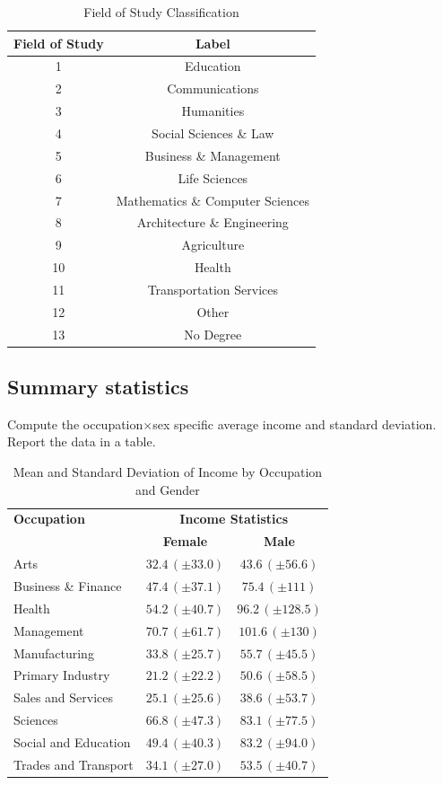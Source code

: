 \documentclass[12pt]{article}
\begin{document}
\begin{table}[h]
\centering
\caption{Field of Study Classification}
\label{tab:field-study-names}
\begin{tabular}{@{}cc@{}}
\toprule
\textbf{Field of Study} & \textbf{Label} \\ \midrule
1  & Education \\
2  & Communications \\
3  & Humanities \\
4  & Social Sciences \& Law \\
5  & Business \& Management \\
6  & Life Sciences \\
7  & Mathematics \& Computer Sciences \\
8  & Architecture \& Engineering \\
9  & Agriculture \\
10 & Health \\
11 & Transportation Services \\
12 & Other \\
13 & No Degree \\
\bottomrule
\end{tabular}
\end{table}

\subsection{Summary statistics}
Compute the occupation$\times$sex specific average income and standard deviation.\\
Report the data in a table.

\begin{table}[H]
\centering
\caption{Mean and Standard Deviation of Income by Occupation and Gender}
\label{tab:income_by_gender}
\begin{tabular}{@{}lcc@{}}
\toprule
\textbf{Occupation} & \multicolumn{2}{c}{\textbf{Income Statistics}} \\
 & \textbf{Female} & \textbf{Male} \\
\midrule
Arts & $32.4 \, (\pm 33.0)$ & $43.6 \, (\pm 56.6)$ \\
Business \& Finance & $47.4 \, (\pm 37.1)$ & $75.4 \, (\pm 111)$ \\
Health & $54.2 \, (\pm 40.7)$ & $96.2 \, (\pm 128.5)$ \\
Management & $70.7 \, (\pm 61.7)$ & $101.6 \, (\pm 130)$ \\
Manufacturing & $33.8 \, (\pm 25.7)$ & $55.7 \, (\pm 45.5)$ \\
Primary Industry & $21.2 \, (\pm 22.2)$ & $50.6 \, (\pm 58.5)$ \\
Sales and Services & $25.1 \, (\pm 25.6)$ & $38.6 \, (\pm 53.7)$ \\
Sciences & $66.8 \, (\pm 47.3)$ & $83.1 \, (\pm 77.5)$ \\
Social and Education & $49.4 \, (\pm 40.3)$ & $83.2 \, (\pm 94.0)$ \\
Trades and Transport & $34.1 \, (\pm 27.0)$ & $53.5 \, (\pm 40.7)$ \\
\bottomrule
\end{tabular}
\end{table}
\end{document}
